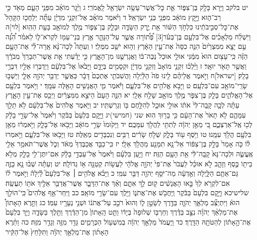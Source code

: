 \documentclass[twoside, openany, parskip=half, 11pt]{book}
\begin{document}
יט בלקב וַיַּ֥רְא בָּלָ֖ק בֶּן־צִפּ֑וֹר אֵ֛ת כׇּל־אֲשֶׁר־עָשָׂ֥ה יִשְׂרָאֵ֖ל לָֽאֱמֹרִֽי׃ ג וַיָּ֨גׇר מוֹאָ֜ב מִפְּנֵ֥י הָעָ֛ם מְאֹ֖ד כִּ֣י רַב־ה֑וּא וַיָּ֣קׇץ מוֹאָ֔ב מִפְּנֵ֖י בְּנֵ֥י יִשְׂרָאֵֽל׃ ד וַיֹּ֨אמֶר מוֹאָ֜ב אֶל־זִקְנֵ֣י מִדְיָ֗ן עַתָּ֞ה יְלַחֲכ֤וּ הַקָּהָל֙ אֶת־כׇּל־סְבִ֣יבֹתֵ֔ינוּ כִּלְחֹ֣ךְ הַשּׁ֔וֹר אֵ֖ת יֶ֣רֶק הַשָּׂדֶ֑ה וּבָלָ֧ק בֶּן־צִפּ֛וֹר מֶ֥לֶךְ לְמוֹאָ֖ב בָּעֵ֥ת הַהִֽוא׃ [לוי]ה וַיִּשְׁלַ֨ח מַלְאָכִ֜ים אֶל־בִּלְעָ֣ם בֶּן־בְּעֹ֗ר‏[3] פְּ֠ת֠וֹרָה אֲשֶׁ֧ר עַל־הַנָּהָ֛ר אֶ֥רֶץ בְּנֵי־עַמּ֖וֹ לִקְרֹא־ל֑וֹ לֵאמֹ֗ר הִ֠נֵּ֠ה עַ֣ם יָצָ֤א מִמִּצְרַ֙יִם֙ הִנֵּ֤ה כִסָּה֙ אֶת־עֵ֣ין הָאָ֔רֶץ וְה֥וּא יֹשֵׁ֖ב מִמֻּלִֽי׃ ו וְעַתָּה֩ לְכָה־נָּ֨א אָֽרָה־לִּ֜י אֶת־הָעָ֣ם הַזֶּ֗ה כִּֽי־עָצ֥וּם הוּא֙ מִמֶּ֔נִּי אוּלַ֤י אוּכַל֙ נַכֶּה־בּ֔וֹ וַאֲגָרְשֶׁ֖נּוּ מִן־הָאָ֑רֶץ כִּ֣י יָדַ֗עְתִּי אֵ֤ת אֲשֶׁר־תְּבָרֵךְ֙ מְבֹרָ֔ךְ וַאֲשֶׁ֥ר תָּאֹ֖ר יוּאָֽר׃ ז וַיֵּ֨לְכ֜וּ זִקְנֵ֤י מוֹאָב֙ וְזִקְנֵ֣י מִדְיָ֔ן וּקְסָמִ֖ים בְּיָדָ֑ם וַיָּבֹ֙אוּ֙ אֶל־בִּלְעָ֔ם וַיְדַבְּר֥וּ אֵלָ֖יו דִּבְרֵ֥י בָלָֽק׃ [ישראל]ח וַיֹּ֣אמֶר אֲלֵיהֶ֗ם לִ֤ינוּ פֹה֙ הַלַּ֔יְלָה וַהֲשִׁבֹתִ֤י אֶתְכֶם֙ דָּבָ֔ר כַּאֲשֶׁ֛ר יְדַבֵּ֥ר יְהֹוָ֖ה אֵלָ֑י וַיֵּשְׁב֥וּ שָׂרֵֽי־מוֹאָ֖ב עִם־בִּלְעָֽם׃ ט וַיָּבֹ֥א אֱלֹהִ֖ים אֶל־בִּלְעָ֑ם וַיֹּ֕אמֶר מִ֛י הָאֲנָשִׁ֥ים הָאֵ֖לֶּה עִמָּֽךְ׃ י וַיֹּ֥אמֶר בִּלְעָ֖ם אֶל־הָאֱלֹהִ֑ים בָּלָ֧ק בֶּן־צִפֹּ֛ר מֶ֥לֶךְ מוֹאָ֖ב שָׁלַ֥ח אֵלָֽי׃ יא הִנֵּ֤ה הָעָם֙ הַיֹּצֵ֣א מִמִּצְרַ֔יִם וַיְכַ֖ס אֶת־עֵ֣ין הָאָ֑רֶץ עַתָּ֗ה לְכָ֤ה קָֽבָה־לִּי֙ אֹת֔וֹ אוּלַ֥י אוּכַ֛ל לְהִלָּ֥חֶם בּ֖וֹ וְגֵרַשְׁתִּֽיו׃ יב וַיֹּ֤אמֶר אֱלֹהִים֙ אֶל־בִּלְעָ֔ם לֹ֥א תֵלֵ֖ךְ עִמָּהֶ֑ם לֹ֤א תָאֹר֙ אֶת־הָעָ֔ם כִּ֥י בָר֖וּךְ הֽוּא׃ שני (חמישי)יג וַיָּ֤קׇם בִּלְעָם֙ בַּבֹּ֔קֶר וַיֹּ֙אמֶר֙ אֶל־שָׂרֵ֣י בָלָ֔ק לְכ֖וּ אֶֽל־אַרְצְכֶ֑ם כִּ֚י מֵאֵ֣ן יְהֹוָ֔ה לְתִתִּ֖י לַהֲלֹ֥ךְ עִמָּכֶֽם׃ יד וַיָּק֙וּמוּ֙ שָׂרֵ֣י מוֹאָ֔ב וַיָּבֹ֖אוּ אֶל־בָּלָ֑ק וַיֹּ֣אמְר֔וּ מֵאֵ֥ן בִּלְעָ֖ם הֲלֹ֥ךְ עִמָּֽנוּ׃ טו וַיֹּ֥סֶף ע֖וֹד בָּלָ֑ק שְׁלֹ֣חַ שָׂרִ֔ים רַבִּ֥ים וְנִכְבָּדִ֖ים מֵאֵֽלֶּה׃ טז וַיָּבֹ֖אוּ אֶל־בִּלְעָ֑ם וַיֹּ֣אמְרוּ ל֗וֹ כֹּ֤ה אָמַר֙ בָּלָ֣ק בֶּן־צִפּ֔וֹר אַל־נָ֥א תִמָּנַ֖ע מֵהֲלֹ֥ךְ אֵלָֽי׃ יז כִּֽי־כַבֵּ֤ד אֲכַבֶּדְךָ֙ מְאֹ֔ד וְכֹ֛ל אֲשֶׁר־תֹּאמַ֥ר אֵלַ֖י אֶֽעֱשֶׂ֑ה וּלְכָה־נָּא֙ קָֽבָה־לִּ֔י אֵ֖ת הָעָ֥ם הַזֶּֽה׃ יח וַיַּ֣עַן בִּלְעָ֗ם וַיֹּ֙אמֶר֙ אֶל־עַבְדֵ֣י בָלָ֔ק אִם־יִתֶּן־לִ֥י בָלָ֛ק מְלֹ֥א בֵית֖וֹ כֶּ֣סֶף וְזָהָ֑ב לֹ֣א אוּכַ֗ל לַעֲבֹר֙ אֶת־פִּי֙ יְהֹוָ֣ה אֱלֹהָ֔י לַעֲשׂ֥וֹת קְטַנָּ֖ה א֥וֹ גְדוֹלָֽה׃ יט וְעַתָּ֗ה שְׁב֨וּ נָ֥א בָזֶ֛ה גַּם־אַתֶּ֖ם הַלָּ֑יְלָה וְאֵ֣דְעָ֔ה מַה־יֹּסֵ֥ף יְהֹוָ֖ה דַּבֵּ֥ר עִמִּֽי׃ כ וַיָּבֹ֨א אֱלֹהִ֥ים ׀ אֶל־בִּלְעָם֮ לַ֒יְלָה֒ וַיֹּ֣אמֶר ל֗וֹ אִם־לִקְרֹ֤א לְךָ֙ בָּ֣אוּ הָאֲנָשִׁ֔ים ק֖וּם לֵ֣ךְ אִתָּ֑ם וְאַ֗ךְ אֶת־הַדָּבָ֛ר אֲשֶׁר־אֲדַבֵּ֥ר אֵלֶ֖יךָ אֹת֥וֹ תַעֲשֶֽׂה׃ שלישיכא וַיָּ֤קׇם בִּלְעָם֙ בַּבֹּ֔קֶר וַֽיַּחֲבֹ֖שׁ אֶת־אֲתֹנ֑וֹ וַיֵּ֖לֶךְ עִם־שָׂרֵ֥י מוֹאָֽב׃ כב וַיִּֽחַר־אַ֣ף אֱלֹהִים֮ כִּֽי־הוֹלֵ֣ךְ הוּא֒ וַיִּתְיַצֵּ֞ב מַלְאַ֧ךְ יְהֹוָ֛ה בַּדֶּ֖רֶךְ לְשָׂטָ֣ן ל֑וֹ וְהוּא֙ רֹכֵ֣ב עַל־אֲתֹנ֔וֹ וּשְׁנֵ֥י נְעָרָ֖יו עִמּֽוֹ׃ כג וַתֵּ֣רֶא הָאָתוֹן֩ אֶת־מַלְאַ֨ךְ יְהֹוָ֜ה נִצָּ֣ב בַּדֶּ֗רֶךְ וְחַרְבּ֤וֹ שְׁלוּפָה֙ בְּיָד֔וֹ וַתֵּ֤ט הָֽאָתוֹן֙ מִן־הַדֶּ֔רֶךְ וַתֵּ֖לֶךְ בַּשָּׂדֶ֑ה וַיַּ֤ךְ בִּלְעָם֙ אֶת־הָ֣אָת֔וֹן לְהַטֹּתָ֖הּ הַדָּֽרֶךְ׃ כד וַֽיַּעֲמֹד֙ מַלְאַ֣ךְ יְהֹוָ֔ה בְּמִשְׁע֖וֹל הַכְּרָמִ֑ים גָּדֵ֥ר מִזֶּ֖ה וְגָדֵ֥ר מִזֶּֽה׃ כה וַתֵּ֨רֶא הָאָת֜וֹן אֶת־מַלְאַ֣ךְ יְהֹוָ֗ה וַתִּלָּחֵץ֙ אֶל־הַקִּ֔יר 
\end{document}
